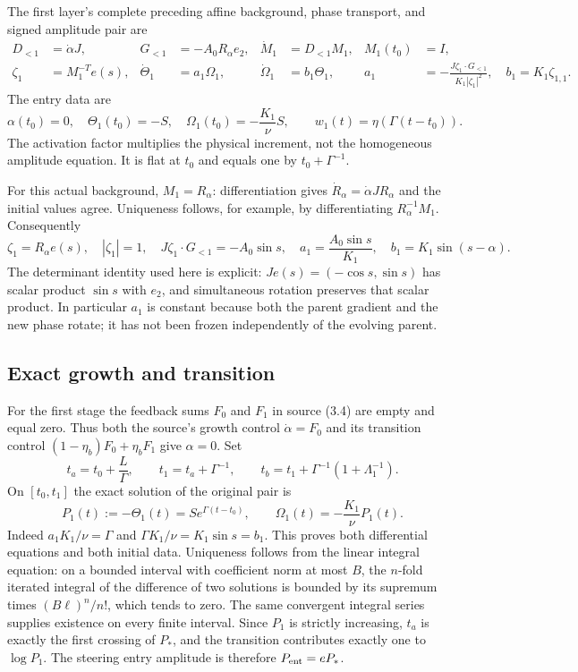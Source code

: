 The first layer's complete preceding affine background, phase transport,
and signed amplitude pair are
\begin{align}
 D_{<1}&=\dot\alpha J,&G_{<1}&=-A_0R_\alpha e_2,
 &\dot M_1&=D_{<1}M_1,&M_1(t_0)&=I,\label{eq:cv-first-background}\\
 \zeta_1&=M_1^{-T}e(s),&
 \dot\Theta_1&=a_1\Omega_1,&
 \dot\Omega_1&=b_1\Theta_1,&
 a_1&=-\frac{J\zeta_1\cdot G_{<1}}{K_1|\zeta_1|^2},\quad
 b_1=K_1\zeta_{1,1}.\label{eq:cv-first-pair}
\end{align}
The entry data are
\[
 \alpha(t_0)=0,\quad \Theta_1(t_0)=-S,\quad
 \Omega_1(t_0)=-\frac{K_1}{\nu}S,
 \qquad w_1(t)=\eta(\Gamma(t-t_0)).
\]
The activation factor multiplies the physical increment, not the
homogeneous amplitude equation. It is flat at $t_0$ and equals one
by $t_0+\Gamma^{-1}$.

For this actual background, $M_1=R_\alpha$: differentiation gives
$\dot R_\alpha=\dot\alpha JR_\alpha$ and the initial values agree.
Uniqueness follows, for example, by differentiating
$R_\alpha^{-1}M_1$. Consequently
\begin{equation}
 \zeta_1=R_\alpha e(s),\quad |\zeta_1|=1,\quad
 J\zeta_1\cdot G_{<1}=-A_0\sin s,\quad
 a_1=\frac{A_0\sin s}{K_1},\quad
 b_1=K_1\sin(s-\alpha).
 \label{eq:cv-first-exact-coefficients}
\end{equation}
The determinant identity used here is explicit:
$J e(s)=(-\cos s,\sin s)$ has scalar product $\sin s$
with $e_2$, and simultaneous rotation preserves that scalar product.
In particular $a_1$ is constant because both the parent gradient and
the new phase rotate; it has not been frozen independently of the
evolving parent.

\subsection{Exact growth and transition}

For the first stage the feedback sums $F_0$ and $F_1$ in source (3.4)
are empty and equal zero. Thus both the source's growth control
$\dot\alpha=F_0$ and its transition control
$(1-\eta_b)F_0+\eta_bF_1$ give $\alpha=0$.
Set
\[
 t_a=t_0+\frac L\Gamma,\qquad
 t_1=t_a+\Gamma^{-1},\qquad
 t_b=t_1+\Gamma^{-1}(1+\Lambda_1^{-1}).
\]
On $[t_0,t_1]$ the exact solution of the original pair is
\begin{equation}
 P_1(t):=-\Theta_1(t)=S e^{\Gamma(t-t_0)},\qquad
 \Omega_1(t)=-\frac{K_1}{\nu}P_1(t).
 \label{eq:cv-first-growth}
\end{equation}
Indeed $a_1K_1/\nu=\Gamma$ and
$\Gamma K_1/\nu=K_1\sin s=b_1$.
This proves both differential equations and both initial data.
Uniqueness follows from the linear integral equation: on a bounded
interval with coefficient norm at most $B$, the $n$-fold iterated
integral of the difference of two solutions is bounded by its supremum
times $(B\ell)^n/n!$, which tends to zero. The same convergent integral
series supplies existence on every finite interval.
Since $P_1$ is strictly increasing, $t_a$ is exactly the first crossing
of $P_*$, and the transition contributes exactly one to $\log P_1$.
The steering entry amplitude is therefore $P_{\rm ent}=eP_*$.


